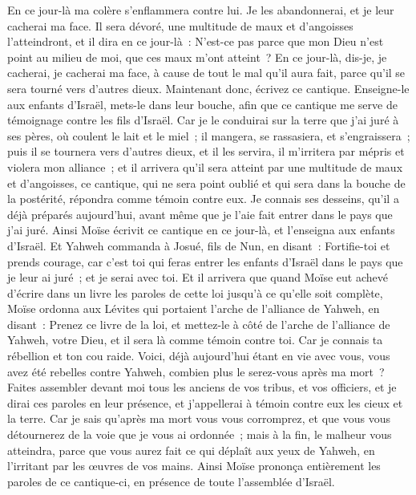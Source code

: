 \begin{multicols}{2}
En ce jour-là ma colère s'enflammera contre lui. Je les abandonnerai, et je leur cacherai ma face. Il sera dévoré, une multitude de maux et d'angoisses l'atteindront, et il dira en ce jour-là~: N'est-ce pas parce que mon Dieu n'est point au milieu de moi, que ces maux m'ont atteint~?
En ce jour-là, dis-je, je cacherai, je cacherai ma face, à cause de tout le mal qu'il aura fait, parce qu'il se sera tourné vers d'autres dieux.
Maintenant donc, écrivez ce cantique. Enseigne-le aux enfants d'Israël, mets-le dans leur bouche, afin que ce cantique me serve de témoignage contre les fils d'Israël.
Car je le conduirai sur la terre que j'ai juré à ses pères, où coulent le lait et le miel~; il mangera, se rassasiera, et s'engraissera~; puis il se tournera vers d'autres dieux, et il les servira, il m'irritera par mépris et violera mon alliance~;
et il arrivera qu'il sera atteint par une multitude de maux et d'angoisses, ce cantique, qui ne sera point oublié et qui sera dans la bouche de la postérité, répondra comme témoin contre eux. Je connais ses desseins, qu'il a déjà préparés aujourd'hui, avant même que je l'aie fait entrer dans le pays que j'ai juré.
Ainsi Moïse écrivit ce cantique en ce jour-là, et l'enseigna aux enfants d'Israël.
Et Yahweh commanda à Josué, fils de Nun, en disant~: Fortifie-toi et prends courage, car c'est toi qui feras entrer les enfants d'Israël dans le pays que je leur ai juré~; et je serai avec toi.
Et il arrivera que quand Moïse eut achevé d'écrire dans un livre les paroles de cette loi jusqu'à ce qu'elle soit complète,
Moïse ordonna aux Lévites qui portaient l'arche de l'alliance de Yahweh, en disant~:
Prenez ce livre de la loi, et mettez-le à côté de l'arche de l'alliance de Yahweh, votre Dieu, et il sera là comme témoin contre toi.
Car je connais ta rébellion et ton cou raide. Voici, déjà aujourd'hui étant en vie avec vous, vous avez été rebelles contre Yahweh, combien plus le serez-vous après ma mort~?
Faites assembler devant moi tous les anciens de vos tribus, et vos officiers, et je dirai ces paroles en leur présence, et j'appellerai à témoin contre eux les cieux et la terre.
Car je sais qu'après ma mort vous vous corromprez, et que vous vous détournerez de la voie que je vous ai ordonnée~; mais à la fin, le malheur vous atteindra, parce que vous aurez fait ce qui déplaît aux yeux de Yahweh, en l'irritant par les œuvres de vos mains.
Ainsi Moïse prononça entièrement les paroles de ce cantique-ci, en présence de toute l'assemblée d'Israël.

\end{multicols}
